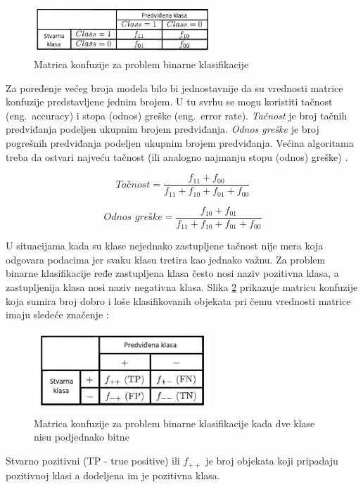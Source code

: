 \documentclass[12pt,oneside]{memoir}
\begin{document}
\begin{figure}[!ht]
  \centering
  \includegraphics[width=0.60\textwidth]{matrica_konfuzije}
  \caption{Matrica konfuzije za problem binarne klasifikacije}
  \label{fig:matrkonf}
\end{figure}

 Za poređenje većeg broja modela bilo bi jednostavnije da su vrednosti matrice konfuzije predstavljene jednim brojem. U tu svrhu se mogu koristiti tačnost (eng.~accuracy)  i stopa (odnos) greške (eng.~error rate). \textit{Tačnost} je broj tačnih predviđanja podeljen ukupnim brojem predviđanja. \textit{Odnos greške} je broj pogrešnih predviđanja podeljen ukupnim brojem predviđanja. Većina algoritama treba da ostvari najveću tačnost (ili analogno najmanju stopu (odnos) greške) \cite{mitic}.

$$ \textit{Tačnost} = \frac{f_{11}+f_{00}}{f_{11}+f_{10}+f_{01}+f_{00}} $$

$$ \textit{Odnos greške} = \frac{f_{10}+f_{01}}{f_{11}+f_{10}+f_{01}+f_{00}} $$


U situacijama kada su klase nejednako zastupljene tačnost nije mera koja odgovara podacima jer svaku klasu tretira kao jednako važnu. Za problem binarne klasifikacije ređe zastupljena klasa često nosi naziv pozitivna klasa, a zastupljenija klasa nosi naziv negativna klasa. Slika \ref{fig:matrkonf2} prikazuje matricu konfuzije koja sumira broj dobro i loše klasifikovanih objekata pri čemu vrednosti matrice imaju sledeće značenje \cite{mitic}:

\begin{figure}[!ht]
  \centering
  \includegraphics[width=0.60\textwidth]{matrica_konfuzije2}
  \caption{Matrica konfuzije za problem binarne klasifikacije kada dve klase nisu podjednako bitne}
  \label{fig:matrkonf2}
\end{figure}

Stvarno pozitivni (TP - true positive) ili $f_{++}$ je broj objekata koji pripadaju pozitivnoj klasi a dodeljena im je pozitivna klasa.
\end{document}
